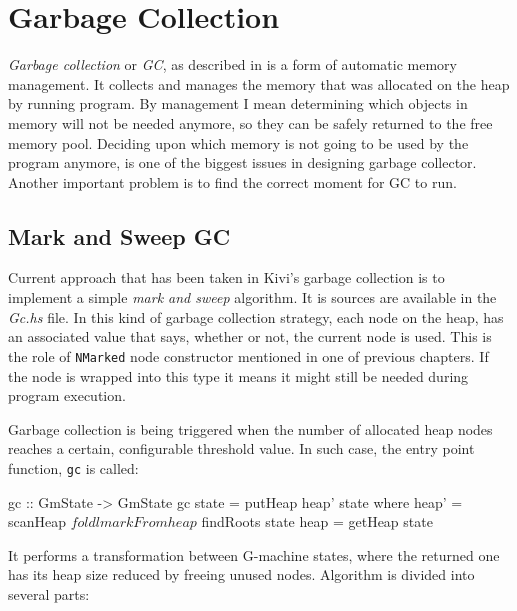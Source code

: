 \documentclass[12pt,a4paper]{report}
\begin{document}
\section{Garbage Collection}
\label{sec:garbage_collection}
\textit{Garbage collection} or \textit{GC}, as described in
\cite{wiki:garbage_collection} is a form of automatic memory management. It
collects and manages the memory that was allocated on the heap by running
program. By management I mean determining which objects in memory will not be
needed anymore, so they can be safely returned to the free memory pool.
Deciding upon which memory is not going to be used by the program anymore, is
one of the biggest issues in designing garbage collector. Another important
problem is to find the correct moment for GC to run.

\subsection{Mark and Sweep GC}
Current approach that has been taken in Kivi's garbage collection is to
implement a simple \textit{mark and sweep} algorithm. It is sources are
available in the \textit{Gc.hs} file. In this kind of garbage collection
strategy, each node on the heap, has an associated value that says, whether or
not, the current node is used. This is the role of \texttt{NMarked} node
constructor mentioned in one of previous chapters. If the node is wrapped into
this type it means it might still be needed during program execution.

Garbage collection is being triggered when the number of allocated heap nodes
reaches a certain, configurable threshold value. In such case, the entry point
function, \texttt{gc} is called:

\vspace*{0.2in}

\begin{code}[style=haskell]
gc :: GmState -> GmState
gc state = putHeap heap' state
    where
        heap' = scanHeap $ foldl markFrom heap $ findRoots state
        heap = getHeap state
\end{code}

It performs a transformation between G-machine states, where the returned one
has its heap size reduced by freeing unused nodes. Algorithm is divided into
several parts:
\end{document}
